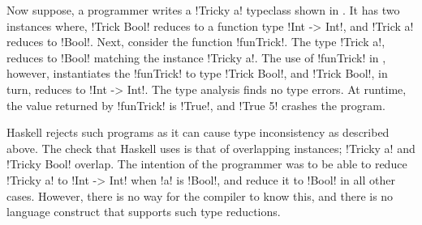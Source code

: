 \documentclass[format=acmsmall,manuscript,screen,nonacm,margin=1in,11pt]{acmart}
\begin{document}
Now suppose, a programmer writes a !Tricky a! typeclass shown in .
It has two instances where, !Trick Bool! reduces to a function type !Int -> Int!, and !Trick a! reduces to !Bool!.
Next, consider the function !funTrick!. The type !Trick a!, reduces to !Bool! matching
the instance !Tricky a!. The use of !funTrick! in \faBomb, however, instantiates
the !funTrick! to type !Trick Bool!, and !Trick Bool!, in turn, reduces to !Int -> Int!.
The type analysis finds no type errors. At runtime, the value returned by !funTrick! is !True!,
and !True 5! crashes the program.

Haskell rejects such programs as it can cause type inconsistency as described above.
The check that Haskell uses is that of overlapping instances; !Tricky a! and !Tricky Bool! overlap.
The intention of the programmer was to be able to reduce !Tricky a! to !Int -> Int!
when !a! is !Bool!, and reduce it to !Bool! in all other cases. However, there is no way for the compiler
to know this, and there is no language construct that supports such type reductions.


\end{document}
